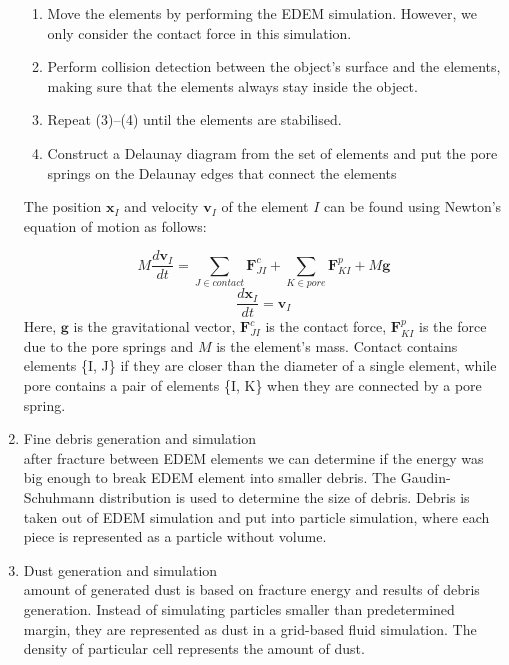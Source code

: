 \begin{enumerate}
\begin{enumerate}
\item Move the elements by performing the EDEM simulation. However, we only consider the contact force in this simulation.
\item Perform collision detection between the object’s surface
and the elements, making sure that the elements always
stay inside the object.
\item Repeat (3)–(4) until the elements are stabilised.
\item Construct a Delaunay diagram from the set of elements
and put the pore springs on the Delaunay edges that connect
the elements
\end{enumerate}
The position $\mathbf{x}_I$ and velocity $\mathbf{v}_I$ of the element $\mathit{I}$ can be found using Newton’s equation of motion as follows:
 
\[M\frac{d\mathbf{v}_I}{dt} = \sum_{J \in contact}^{} \mathbf{F}_{JI}^c + \sum_{K \in pore}^{} \mathbf{F}_{KI}^p + M\mathbf{g} \]
\[ \frac{d\mathbf{x}_I}{dt} = \mathbf{v}_I \]
Here, $\mathbf{g}$ is the gravitational vector, $\mathbf{F}^c_{JI}$ is the contact force, $\mathbf{F}^p_{KI}$ is the force due to the pore springs and $\mathit{M}$ is the element’s mass. Contact contains elements \{I, J\} if they are closer than the diameter of a single element, while pore
contains a pair of elements \{I, K\} when they are connected by a pore spring.

\item Fine debris generation and simulation \\after fracture between EDEM elements we can determine if the energy was big enough to break EDEM element into smaller debris. The Gaudin-Schuhmann distribution is used to determine the size of debris. Debris is taken out of EDEM simulation and put into particle simulation, where each piece is represented as a particle without volume.

\item Dust generation and simulation \\ amount of generated dust is based on fracture energy and results of debris generation. Instead of simulating particles smaller than predetermined margin, they are represented as dust in a grid-based fluid simulation. The density of particular cell represents the amount of dust.

\end{enumerate}

